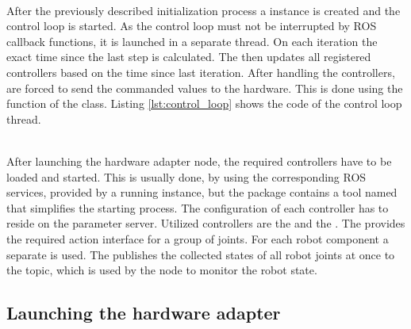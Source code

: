 \begin{minipage}{\linewidth}

\end{minipage} \\

After the previously described initialization process a  instance is created and the control loop is started. As the control loop must not be interrupted by ROS callback functions, it is launched in a separate thread. On each iteration the exact time since the last step is calculated. The  then updates all registered controllers based on the time since last iteration. After handling the controllers,  are forced to send the commanded values to the hardware. This is done using the  function of the  class. Listing \ref{lst:control_loop} shows the code of the control loop thread. \\

\begin{minipage}{\linewidth}

\end{minipage} \\

After launching the hardware adapter node, the required controllers have to be loaded and started. This is usually done, by using the corresponding ROS services, provided by a running  instance, but the  package contains a tool named  that simplifies the starting process. The configuration of each controller has to reside on the parameter server. Utilized controllers are the  and the . The  provides the required  action interface for a group of joints. For each robot component a separate  is used. The  publishes the collected states of all robot joints at once to the  topic, which is used by the  node to monitor the robot state.

\subsection{Launching the hardware adapter}
\label{sec:launch_moveit}

